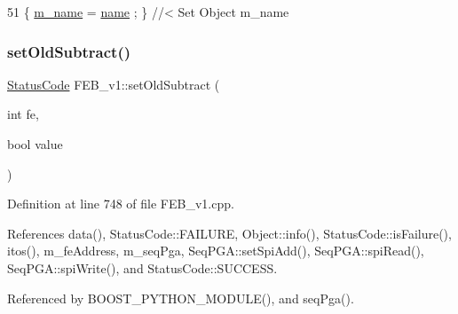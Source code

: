 \begin{DoxyCode}
51 \{ \hyperlink{classObject_a8b83c95c705d2c3ba0d081fe1710f48d}{m\_name}  = \hyperlink{classObject_a300f4c05dd468c7bb8b3c968868443c1}{name}  ; \} \textcolor{comment}{//< Set Object m\_name}
\end{DoxyCode}
\mbox{\label{classFEB__v1_aec8198d5c03ddc5dd9151683f9506d00}} 
\subsubsection{\texorpdfstring{set\+Old\+Subtract()}{setOldSubtract()}}
{\footnotesize\ttfamily \hyperlink{classStatusCode}{Status\+Code} F\+E\+B\+\_\+v1\+::set\+Old\+Subtract (\begin{DoxyParamCaption}\item[{int}]{fe,  }\item[{bool}]{value }\end{DoxyParamCaption})}



Definition at line 748 of file F\+E\+B\+\_\+v1.\+cpp.



References data(), Status\+Code\+::\+F\+A\+I\+L\+U\+RE, Object\+::info(), Status\+Code\+::is\+Failure(), itos(), m\+\_\+fe\+Address, m\+\_\+seq\+Pga, Seq\+P\+G\+A\+::set\+Spi\+Add(), Seq\+P\+G\+A\+::spi\+Read(), Seq\+P\+G\+A\+::spi\+Write(), and Status\+Code\+::\+S\+U\+C\+C\+E\+SS.



Referenced by B\+O\+O\+S\+T\+\_\+\+P\+Y\+T\+H\+O\+N\+\_\+\+M\+O\+D\+U\+L\+E(), and seq\+Pga().


